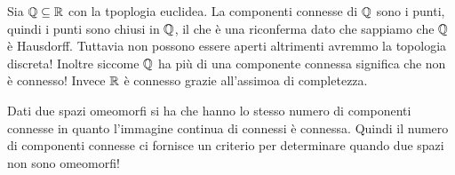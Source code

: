 \begin{example}
	Sia $\mathbb{Q}\subseteq\mathbb{R}$ con la tpoplogia euclidea. La componenti connesse di $\mathbb{Q}$ sono i punti, quindi i punti sono chiusi in $\mathbb{Q}$, il che è una riconferma dato che sappiamo che $\mathbb{Q}$ è Hausdorff. Tuttavia non possono essere aperti altrimenti avremmo la topologia discreta!\newline
	Inoltre siccome $\mathbb{Q}$ ha più di una componente connessa significa che non è connesso! Invece $\mathbb{R}$ è connesso grazie all'assimoa di completezza.
\end{example}

\begin{observe}
	Dati due spazi omeomorfi si ha che hanno lo stesso numero di componenti connesse in quanto l'immagine continua di connessi è connessa. Quindi il numero di componenti connesse ci fornisce un criterio per determinare quando due spazi non sono omeomorfi!
\end{observe}
